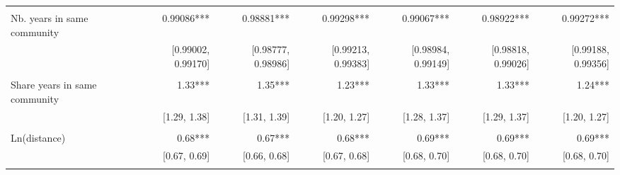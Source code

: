 \begin{table}[!h]
\begin{tabular}{lllllll}
  \multicolumn{1}{r}{} &
  \multicolumn{1}{r}{} &
  \multicolumn{1}{r}{} &
  \multicolumn{1}{r}{} &
  \multicolumn{1}{r}{} \\
\multicolumn{1}{l}{Nb. years in same community} &
  \multicolumn{1}{|r}{0.99086***} &
  \multicolumn{1}{r}{0.98881***} &
  \multicolumn{1}{r}{0.99298***} &
  \multicolumn{1}{r}{0.99067***} &
  \multicolumn{1}{r}{0.98922***} &
  \multicolumn{1}{r}{0.99272***} \\
\multicolumn{1}{l}{} &
  \multicolumn{1}{|r}{[0.99002, 0.99170]} &
  \multicolumn{1}{r}{[0.98777, 0.98986]} &
  \multicolumn{1}{r}{[0.99213, 0.99383]} &
  \multicolumn{1}{r}{[0.98984, 0.99149]} &
  \multicolumn{1}{r}{[0.98818, 0.99026]} &
  \multicolumn{1}{r}{[0.99188, 0.99356]} \\
\multicolumn{1}{l}{} &
  \multicolumn{1}{|r}{} &
  \multicolumn{1}{r}{} &
  \multicolumn{1}{r}{} &
  \multicolumn{1}{r}{} &
  \multicolumn{1}{r}{} &
  \multicolumn{1}{r}{} \\
\multicolumn{1}{l}{Share years in same community} &
  \multicolumn{1}{|r}{1.33***} &
  \multicolumn{1}{r}{1.35***} &
  \multicolumn{1}{r}{1.23***} &
  \multicolumn{1}{r}{1.33***} &
  \multicolumn{1}{r}{1.33***} &
  \multicolumn{1}{r}{1.24***} \\
\multicolumn{1}{l}{} &
  \multicolumn{1}{|r}{[1.29,    1.38]} &
  \multicolumn{1}{r}{[1.31,    1.39]} &
  \multicolumn{1}{r}{[1.20,    1.27]} &
  \multicolumn{1}{r}{[1.28,    1.37]} &
  \multicolumn{1}{r}{[1.29,    1.37]} &
  \multicolumn{1}{r}{[1.20,    1.27]} \\
\multicolumn{1}{l}{} &
  \multicolumn{1}{|r}{} &
  \multicolumn{1}{r}{} &
  \multicolumn{1}{r}{} &
  \multicolumn{1}{r}{} &
  \multicolumn{1}{r}{} &
  \multicolumn{1}{r}{} \\
\multicolumn{1}{l}{Ln(distance)} &
  \multicolumn{1}{|r}{0.68***} &
  \multicolumn{1}{r}{0.67***} &
  \multicolumn{1}{r}{0.68***} &
  \multicolumn{1}{r}{0.69***} &
  \multicolumn{1}{r}{0.69***} &
  \multicolumn{1}{r}{0.69***} \\
\multicolumn{1}{l}{} &
  \multicolumn{1}{|r}{[0.67,    0.69]} &
  \multicolumn{1}{r}{[0.66,    0.68]} &
  \multicolumn{1}{r}{[0.67,    0.68]} &
  \multicolumn{1}{r}{[0.68,    0.70]} &
  \multicolumn{1}{r}{[0.68,    0.70]} &
  \multicolumn{1}{r}{[0.68,    0.70]} \\
\multicolumn{1}{l}{} &
  \multicolumn{1}{|r}{} &
  \multicolumn{1}{r}{} &
  \multicolumn{1}{r}{} &
  \multicolumn{1}{r}{} &
  \multicolumn{1}{r}{} &
  \multicolumn{1}{r}{} \\

\end{tabular}
\end{table}
